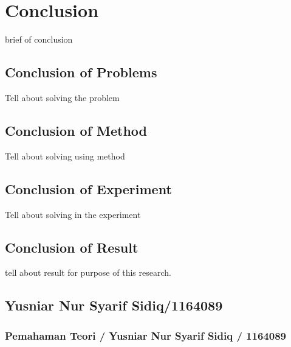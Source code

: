 \chapter{Conclusion}
brief of conclusion

\section{Conclusion of Problems}
Tell about solving the problem

\section{Conclusion of Method}
Tell about solving using method

\section{Conclusion of Experiment}
Tell about solving in the experiment

\section{Conclusion of Result}
tell about result for purpose of this research.

\section{Yusniar Nur Syarif Sidiq/1164089}
\subsection{Pemahaman Teori / Yusniar Nur Syarif Sidiq / 1164089}

